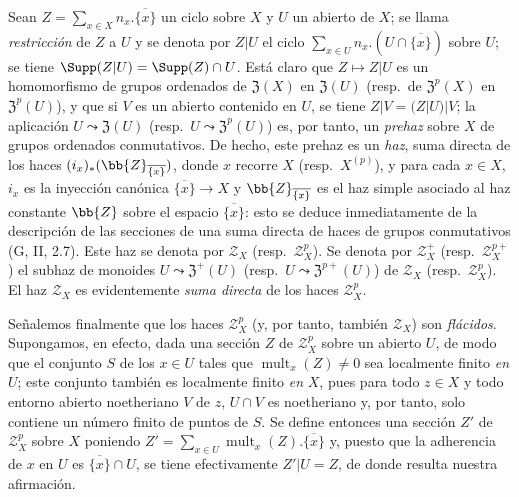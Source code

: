 \begin{env}[21.6.3]
\label{IV.21.6.3}
Sean $Z=\sum_{x\in X}n_x.\overline{\{x\}}$ un ciclo sobre $X$ y $U$ un abierto de $X$;
se llama \emph{restricción} de $Z$ a $U$ y se denota por $Z|U$ el ciclo $\sum_{x\in U}n_x.(U\cap\overline{\{x\}})$ sobre $U$;
se tiene $\Supp(Z|U)=\Supp(Z)\cap U$.
Está claro que $Z\mapsto Z|U$ es un homomorfismo de grupos ordenados de $\mathfrak{Z}(X)$ en $\mathfrak{Z}(U)$ (resp.\ de $\mathfrak{Z}^p(X)$ en $\mathfrak{Z}^p(U)$), y que si $V$ es un abierto contenido en $U$, se tiene $Z|V=(Z|U)|V$;
la aplicación $U\leadsto\mathfrak{Z}(U)$ (resp.\ $U\leadsto\mathfrak{Z}^p(U)$) es, por tanto, un \emph{prehaz} sobre $X$ de grupos ordenados conmutativos.
De hecho, este prehaz es un \emph{haz}, suma directa de los haces $(i_x)_*(\bb{Z}_{\overline{\{x\}}})$, donde $x$ recorre $X$ (resp.\ $X^{(p)}$), y para cada $x\in X$, $i_x$ es la inyección canónica $\overline{\{x\}}\to X$ y $\bb{Z}_{\overline{\{x\}}}$ es el haz simple asociado al haz constante $\bb{Z}$ sobre el espacio $\overline{\{x\}}$:
esto se deduce inmediatamente de la descripción de las secciones de una suma directa de haces de grupos conmutativos (G, II, 2.7).
Este haz se denota por $\mathscr{Z}_X$ (resp.\ $\mathscr{Z}_X^p$).
Se denota por $\mathscr{Z}_X^+$ (resp.\ $\mathscr{Z}_X^{p+}$) el subhaz
de monoides $U\leadsto\mathfrak{Z}^+(U)$ (resp.\ $U\leadsto\mathfrak{Z}^{p+}(U)$) de $\mathscr{Z}_X$ (resp.\ $\mathscr{Z}_X^p$).
El haz $\mathscr{Z}_X$ es evidentemente \emph{suma directa} de los haces $\mathscr{Z}_X^p$.

Señalemos finalmente que los haces $\mathscr{Z}_X^p$ (y, por tanto, también $\mathscr{Z}_X$) son \emph{flácidos}.
Supongamos, en efecto, dada una sección $Z$ de $\mathscr{Z}_X^p$ sobre un abierto $U$, de modo que el conjunto $S$ de los $x\in U$ tales que $\operatorname{mult}_x(Z)\neq0$ sea localmente finito \emph{en} $U$;
este conjunto también es localmente finito \emph{en} $X$, pues para todo $z\in X$ y todo entorno abierto noetheriano $V$ de $z$, $U\cap V$ es noetheriano y, por tanto, solo contiene un número finito de puntos de $S$.
Se define entonces una sección $Z'$ de $\mathscr{Z}_X^p$ sobre $X$ poniendo $Z'=\sum_{x\in U}\operatorname{mult}_x(Z).\overline{\{x\}}$ y, puesto que la adherencia de $x$ en $U$ es $\overline{\{x\}}\cap U$, se tiene efectivamente $Z'|U=Z$, de donde resulta nuestra afirmación.
\end{env}

